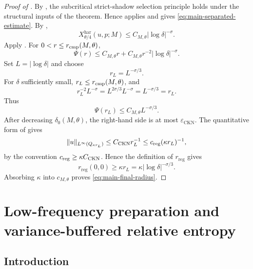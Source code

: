 \documentclass[11pt]{article}
\numberwithin{equation}{section}
\theoremstyle{plain}
\theoremstyle{definition}
\theoremstyle{remark}
\newcommand{\eps}{\varepsilon}
\newcommand{\reg}{\mathrm{reg}}
\newcommand{\har}{\mathrm{har}}
\newcommand{\CKN}{\mathrm{CKN}}
\begin{document}
\begin{proof}[Proof of ]
By , the subcritical strict-shadow selection principle holds under the structural inputs of the theorem.  Hence  applies and gives \eqref{eq:main-separated-estimate}.  By ,
\[
        X^{\har}_{\theta/4}(u,p;M)\le C_{M,\theta}|\log\delta|^{-\sigma}.
\]
Apply .  For \(0<r\le r_{\rm cmp}(M,\theta)\),
\[
        \Psi(r)\le C_{M,\theta}r+C_{M,\theta}r^{-2}|\log\delta|^{-\sigma}.
\]
Set \(L=|\log\delta|\) and choose
\[
        r_L=L^{-\sigma/3}.
\]
For \(\delta\) sufficiently small, \(r_L\le r_{\rm cmp}(M,\theta)\), and
\[
        r_L^{-2}L^{-\sigma}=L^{2\sigma/3}L^{-\sigma}=L^{-\sigma/3}=r_L.
\]
Thus
\[
        \Psi(r_L)\le C_{M,\theta}L^{-\sigma/3}.
\]
After decreasing \(\delta_0(M,\theta)\), the right-hand side is at most \(\eps_{\CKN}\).  The quantitative form of  gives
\[
        \|u\|_{L^\infty(Q_{\kappa r_L})}\le C_{\CKN}r_L^{-1}
        \le c_{\rm reg}(\kappa r_L)^{-1},
\]
by the convention \(c_{\rm reg}\ge\kappa C_{\CKN}\).  Hence the definition of \(r_{\reg}\) gives
\[
        r_{\reg}(0,0)\ge \kappa r_L=\kappa|\log\delta|^{-\sigma/3}.
\]
Absorbing \(\kappa\) into \(c_{M,\theta}\) proves \eqref{eq:main-final-radius}.
\end{proof}

\appendix
\section{Low-frequency preparation and variance-buffered relative entropy}\label{app:partI}

\subsection{Introduction}
\end{document}
